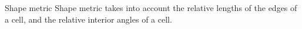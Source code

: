 \documentclass[t,12pt]{beamer}
\begin{document}
\begin{frame}{Shape metric}
Shape metric takes into account the relative lengths of the edges of a cell, and the relative interior angles of a cell.
 \begin{figure}
 	\centering
 	\hspace{0.2in}
 	\subfloat{
}
\end{figure}
\end{frame}
\end{document}
